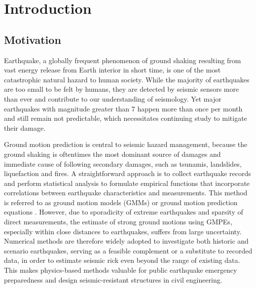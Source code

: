 
\linespread{1.7}
\chapter{Introduction}
\linespread{2.0}
\label{chap:intro}

\section{Motivation}
Earthquake, a globally frequent phenomenon of ground shaking resulting from vast energy release from Earth interior in short time, is one of the most catastrophic natural hazard to human society. While the majority of earthquakes are too small to be felt by humans, they are detected by seismic sensors more than ever and contribute to our understanding of seismology. Yet major earthquakes with magnitude greater than 7 happen more than once per month and still remain not predictable, which necessitates continuing study to mitigate their damage.

Ground motion prediction is central to seismic hazard management, because the ground shaking is oftentimes the most dominant source of damages and immediate cause of following secondary damages, such as tsunamis, landslides, liquefaction and fires. A straightforward approach is to collect earthquake records and perform statistical analysis to formulate empirical functions that incorporate correlations between earthquake characteristics and measurements. This method is referred to as ground motion models (GMMs) or ground motion prediction equations \citep[GMPEs; e.g., ][]{abrahamsonSummaryASK14Ground2014,booreNGAWest2EquationsPredicting2014,campbellNGAWest2GroundMotion2014,chiouUpdateChiouYoungs2014, idrissNGAWest2EmpiricalModel2014}. However, due to sporadicity of extreme earthquakes and sparsity of direct measurements, the estimate of strong ground motions using GMPEs, especially within close distances to earthquakes, suffers from large uncertainty. Numerical methods are therefore widely adopted to investigate both historic and scenario earthquakes, serving as a feasible complement or a substitute to recorded data, in order to estimate seismic rick even beyond the range of existing data. This makes physics-based methods valuable for public earthquake emergency preparedness and design seismic-resistant structures in civil engineering.

